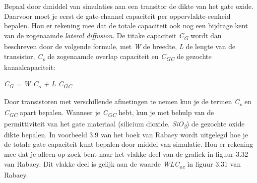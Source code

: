 Bepaal door dmiddel van simulaties aan een transitor de dikte van het gate oxide. Daarvoor moet je eerst de gate-channel capaciteit per oppervlakte-eenheid bepalen. Hou er rekening mee dat de totale capaciteit ook nog een bijdrage kent van de zogenaamde \emph{lateral diffusion}. De titake capaciteit \emph{C\textsubscript{G}} wordt dan beschreven door de volgende formule, met \emph{W} de breedte, \emph{L} de lengte van de transistor, \emph{C\textsubscript{o}} de zogenaamde overlap capaciteit en \emph{C\textsubscript{GC}} de gezochte kanaalcapaciteit:
\begin{center}
\emph{C\textsubscript{G} = W \ast C\textsubscript{o} + L \astW \ast C\textsubscript{GC}}
\end{center}
Door transistoren met verschillende afmetingen te nemen kun je de termen \emph{C\textsubscript{o}} en \emph{C\textsubscript{GC}} apart bepalen. Wanneer je \emph{C\textsubscript{GC}} hebt, kun je met behulp van de permittiviteit van het gate materiaal (silicium dioxide, \emph{SiO\textsubscript{2}}) de gezochte oxide dikte bepalen. In voorbeeld 3.9 van het boek van Rabaey wordt uitgelegd hoe je de totale gate capaciteit kunt bepalen door middel van simulatie. Hou er rekening mee dat je alleen op zoek bent naar het vlakke deel van de grafiek in figuur 3.32 van Rabaey. Dit vlakke deel is gelijk aan de waarde \emph{WLC\textsubscript{ox}} in figuur 3.31 van Rabaey.

